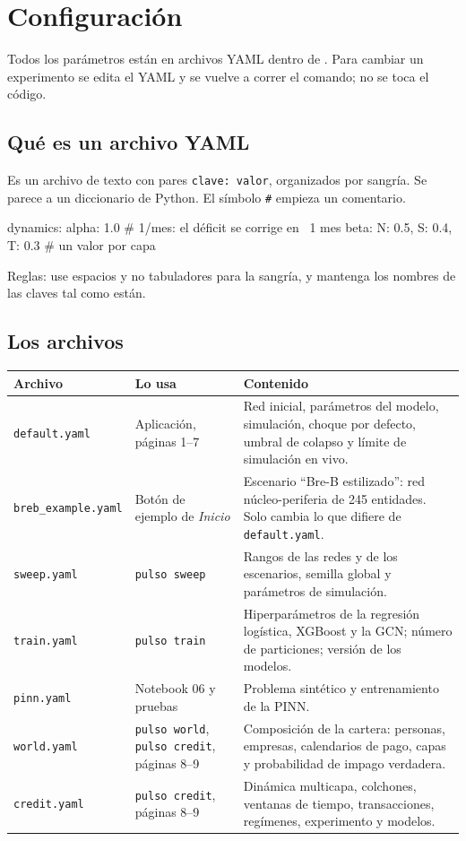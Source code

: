 \chapter{Configuración}
\label{cap:config}

Todos los parámetros están en archivos YAML dentro de . Para cambiar un
experimento se edita el YAML y se vuelve a correr el comando; no se toca el código.

\section{Qué es un archivo YAML}
Es un archivo de texto con pares \texttt{clave: valor}, organizados por sangría. Se
parece a un diccionario de Python. El símbolo \texttt{\#} empieza un comentario.
\begin{archivo}[label=ejemplo]
dynamics:
  alpha: 1.0                       # 1/mes: el déficit se corrige en ~1 mes
  beta: {N: 0.5, S: 0.4, T: 0.3}   # un valor por capa
\end{archivo}
Reglas: use espacios y no tabuladores para la sangría, y mantenga los nombres de las
claves tal como están.

\section{Los archivos}
\begin{longtable}{L{0.2\textwidth}L{0.2\textwidth}L{0.52\textwidth}}
\toprule
\textbf{Archivo} & \textbf{Lo usa} & \textbf{Contenido} \\
\midrule
\endhead
\texttt{default.yaml} & Aplicación, páginas 1–7 & Red inicial, parámetros del modelo,
simulación, choque por defecto, umbral de colapso y límite de simulación en vivo. \\
\texttt{breb\_example.yaml} & Botón de ejemplo de \emph{Inicio} & Escenario ``Bre-B
estilizado'': red núcleo-periferia de 245 entidades. Solo cambia lo que difiere de
\texttt{default.yaml}. \\
\texttt{sweep.yaml} & \texttt{pulso sweep} & Rangos de las redes y de los escenarios,
semilla global y parámetros de simulación. \\
\texttt{train.yaml} & \texttt{pulso train} & Hiperparámetros de la regresión logística,
XGBoost y la GCN; número de particiones; versión de los modelos. \\
\texttt{pinn.yaml} & Notebook 06 y pruebas & Problema sintético y entrenamiento de la
PINN. \\
\texttt{world.yaml} & \texttt{pulso world}, \texttt{pulso credit}, páginas 8–9 &
Composición de la cartera: personas, empresas, calendarios de pago, capas y
probabilidad de impago verdadera. \\
\texttt{credit.yaml} & \texttt{pulso credit}, páginas 8–9 & Dinámica multicapa,
colchones, ventanas de tiempo, transacciones, regímenes, experimento y modelos. \\
\bottomrule
\end{longtable}

